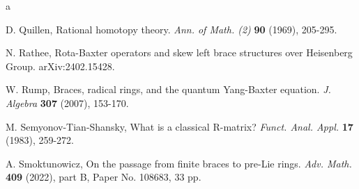 \documentclass[12pt]{amsart}
\theoremstyle{definition}   %
\begin{document}
\begin{thebibliography}{a}





D. Quillen,  Rational homotopy theory. {\em Ann. of Math. (2)}  \textbf{90} (1969), 205-295.


 N. Rathee, Rota-Baxter operators and skew left brace structures over Heisenberg Group. arXiv:2402.15428.

 W. Rump,   Braces, radical rings, and the quantum Yang-Baxter equation. \emph{J. Algebra} \textbf{307} (2007),  153-170.

 M. Semyonov-Tian-Shansky, What is a classical R-matrix? \emph{Funct. Anal. Appl.} {\bf 17} (1983), 259-272.


	

 A. Smoktunowicz,  On the passage from finite braces to pre-Lie rings. {\em Adv. Math.} {\bf409} (2022), part B, Paper No. 108683, 33 pp.





\end{thebibliography}
\end{document}
